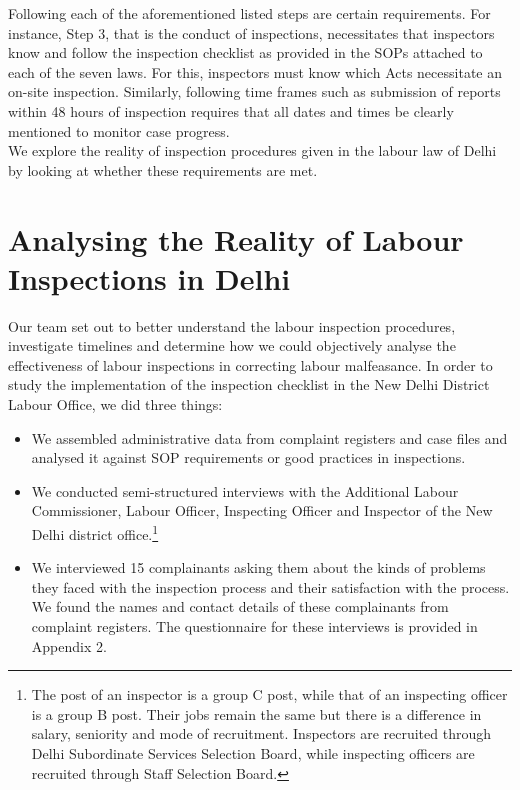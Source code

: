 \documentclass[a4paper, 12pt, twoside]{article}
\begin{document}
Following each of the aforementioned listed steps are certain requirements. For instance, Step 3, that is the conduct of inspections, necessitates that inspectors know and follow the inspection checklist as provided in the SOPs attached to each of the seven laws. For this, inspectors must know which Acts necessitate an on-site inspection. Similarly, following time frames such as submission of reports within 48 hours of inspection requires that all dates and times be clearly mentioned to monitor case progress. \\

We explore the reality of inspection procedures given in the labour law of Delhi by looking at whether these requirements are met. \\

\section{Analysing the Reality of Labour Inspections in Delhi}\label{sec:2}

Our team set out to better understand the labour inspection procedures, investigate timelines and determine how we could objectively analyse the effectiveness of labour inspections in correcting labour malfeasance. In order to study the implementation of the inspection checklist in the New Delhi District Labour Office, we did three things:

\begin{itemize}
\item We assembled administrative data from complaint registers and case files and analysed it against SOP requirements or good practices in inspections.
\item We conducted semi-structured interviews with the Additional Labour Commissioner, Labour Officer, Inspecting Officer and Inspector of the New Delhi district office.\footnote{The post of an inspector is a group C post, while that of an inspecting officer is a group B post. Their jobs remain the same but there is a difference in salary, seniority and mode of recruitment. Inspectors are recruited through Delhi Subordinate Services Selection Board, while inspecting officers are recruited through Staff Selection Board.}
\item We interviewed 15 complainants asking them about the kinds of problems they faced with the inspection process and their satisfaction with the process. We found the names and contact details of these complainants from complaint registers. The questionnaire for these interviews is provided in Appendix 2. 
\end{itemize}
\end{document}
